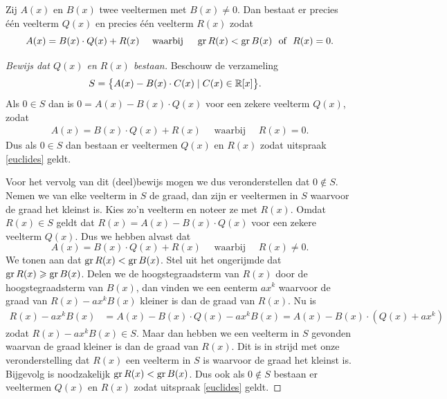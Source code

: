 \documentclass{ximera}
\begin{document}
\begin{stelling}
Zij $A(x)$ en $B(x)$ twee veeltermen met $B(x) \neq 0$. Dan bestaat er precies \'e\'en veelterm $Q(x)$ en precies \'e\'en veelterm $R(x)$ zodat
\begin{equation} \label{euclides}
A(x) = B(x)\cdot Q(x) + R(x) \quad \text{ waarbij } \quad \operatorname{gr} R(x) < \operatorname{gr} B(x) \,\, \text{ of } \,\, R(x) = 0.
\end{equation}
\end{stelling}
\begin{Uitbreiding}
\begin{proof}[Bewijs dat $Q(x)$ en $R(x)$ bestaan] Beschouw de verzameling 
\begin{align*}
S & = \bigl\{ A(x) - B(x)\cdot C(x) \mid C(x) \in \mathbb{R}[x] \bigr\}.  
\end{align*}
Als $0 \in S$ dan is $0 = A(x) - B(x)\cdot Q(x)$ voor een zekere veelterm $Q(x)$, zodat \begin{align*}
A(x) = B(x)\cdot Q(x) + R(x) \quad \text{ waarbij } \quad R(x) = 0.
\end{align*}
Dus als $0 \in S$ dan bestaan er veeltermen $Q(x)$ en $R(x)$ zodat uitspraak \eqref{euclides} geldt. 

Voor het vervolg van dit (deel)bewijs mogen we dus veronderstellen dat $0 \not\in S$. Nemen we van elke veelterm in $S$ de graad, dan zijn er veeltermen in $S$ waarvoor de graad het kleinst is. Kies zo'n veelterm en noteer ze met $R(x)$. Omdat $R(x) \in S$ geldt dat $R(x) = A(x) - B(x)\cdot Q(x)$ voor een zekere veelterm $Q(x)$. Dus we hebben alvast dat
\[
A(x) = B(x)\cdot Q(x) + R(x) \quad \text{ waarbij } \quad R(x) \neq 0.
\]
We tonen aan dat $\operatorname{gr} R(x) < \operatorname{gr} B(x)$. Stel uit het ongerijmde dat $\operatorname{gr} R(x) \geqslant \operatorname{gr} B(x)$. Delen we de hoogstegraadsterm van $R(x)$ door de hoogstegraadsterm van $B(x)$, dan vinden we een eenterm $ax^k$ waarvoor de graad van $R(x) - ax^k B(x)$ kleiner is dan de graad van $R(x)$. Nu is
\begin{align*}
R(x) - ax^k B(x) & = A(x) - B(x)\cdot Q(x) - ax^k B(x) = A(x) - B(x)\cdot (Q(x) + ax^k) 
\end{align*}
zodat $R(x) - ax^k B(x) \in S$. Maar dan hebben we een veelterm in $S$ gevonden waarvan de graad kleiner is dan de graad van $R(x)$. Dit is in strijd  met onze veronderstelling dat $R(x)$ een veelterm in $S$ is waarvoor de graad het kleinst is. Bijgevolg is noodzakelijk $\operatorname{gr} R(x) < \operatorname{gr} B(x)$. Dus ook als $0 \not\in S$ bestaan er veeltermen $Q(x)$ en $R(x)$ zodat uitspraak \eqref{euclides} geldt.
\end{proof}
\end{Uitbreiding}
\end{document}
